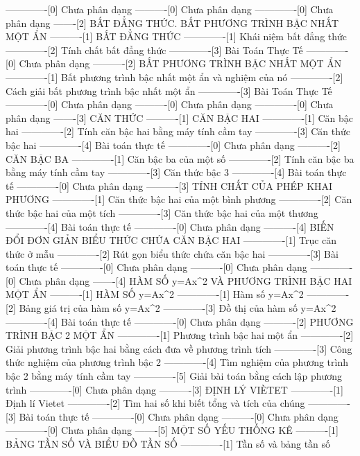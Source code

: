 -------------[0] Chưa phân dạng
----------[0] Chưa phân dạng
-------------[0] Chưa phân dạng
-------[2] BẤT ĐẲNG THỨC. BẤT PHƯƠNG TRÌNH BẬC NHẤT MỘT ẨN
----------[1] BẤT ĐẲNG THỨC
-------------[1] Khái niệm bất đẳng thức
-------------[2] Tính chất bất đẳng thức
-------------[3] Bài Toán Thực Tế
-------------[0] Chưa phân dạng
----------[2] BẤT PHƯƠNG TRÌNH BẬC NHẤT MỘT ẨN
-------------[1] Bất phương trình bậc nhất một ẩn và nghiệm của nó
-------------[2] Cách giải bất phương trình bậc nhất một ẩn
-------------[3] Bài Toán Thực Tế
-------------[0] Chưa phân dạng
----------[0] Chưa phân dạng
-------------[0] Chưa phân dạng
-------[3] CĂN THỨC
----------[1] CĂN BẬC HAI
-------------[1] Căn bậc hai
-------------[2] Tính căn bậc hai bằng máy tính cầm tay
-------------[3] Căn thức bậc hai
-------------[4] Bài toán thực tế
-------------[0] Chưa phân dạng
----------[2] CĂN BẬC BA
-------------[1] Căn bậc ba của một số
-------------[2] Tính căn bậc ba bằng máy tính cầm tay
-------------[3] Căn thức bậc 3
-------------[4] Bài toán thực tế
-------------[0] Chưa phân dạng
----------[3] TÍNH CHẤT CỦA PHÉP KHAI PHƯƠNG
-------------[1] Căn thức bậc hai của một bình phương
-------------[2] Căn thức bậc hai của một tích
-------------[3] Căn thức bậc hai của một thương
-------------[4] Bài toán thực tế
-------------[0] Chưa phân dạng
----------[4] BIẾN ĐỔI ĐƠN GIẢN BIỂU THỨC CHỨA CĂN BẬC HAI
-------------[1] Trục căn thức ở mẫu
-------------[2] Rút gọn biểu thức chứa căn bậc hai
-------------[3] Bài toán thực tế
-------------[0] Chưa phân dạng
----------[0] Chưa phân dạng
-------------[0] Chưa phân dạng
-------[4] HÀM SỐ y=Ax^2 VÀ PHƯƠNG TRÌNH BẬC HAI MỘT ẨN
----------[1] HÀM SỐ y=Ax^2
-------------[1] Hàm số y=Ax^2
-------------[2] Bảng giá trị của hàm số y=Ax^2
-------------[3] Đồ thị của hàm số y=Ax^2
-------------[4] Bài toán thực tế
-------------[0] Chưa phân dạng
----------[2] PHƯƠNG TRÌNH BẬC 2 MỘT ẨN
-------------[1] Phương trình bậc hai một ẩn
-------------[2] Giải phương trình bậc hai bằng cách đưa về phương trình tích
-------------[3] Công thức nghiệm của phương trình bậc 2
-------------[4] Tìm nghiệm của phương trình bậc 2 bằng máy tính cầm tay
-------------[5] Giải bài toán bằng cách lập phương trình
-------------[0] Chưa phân dạng
----------[3] ĐỊNH LÝ VIÈTET
-------------[1] Định lí Vietet
-------------[2] Tìm hai số khi biết tổng và tích của chúng
-------------[3] Bài toán thực tế
-------------[0] Chưa phân dạng
----------[0] Chưa phân dạng
-------------[0] Chưa phân dạng
-------[5] MỘT SỐ YẾU THỐNG KÊ
----------[1] BẢNG TẦN SỐ VÀ BIỂU ĐỒ TẦN SỐ
-------------[1] Tần số và bảng tần số
